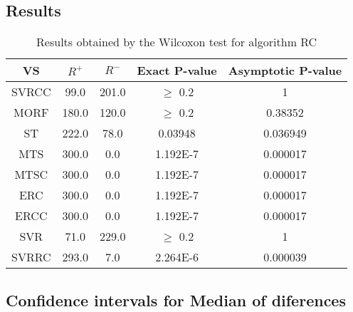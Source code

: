 \documentclass[a4paper,10pt]{article}
\begin{document}
\subsection{Results}

\begin{table}[!htp]
\centering\small
\begin{tabular}{
|c|c|c|c|c|}
\hline
 VS & $R^{+}$ & $R^{-}$ & Exact P-value & Asymptotic P-value \\ \hline 
SVRCC & 99.0 & 201.0 & $\geq$ 0.2 & 1\\ \hline 
MORF & 180.0 & 120.0 & $\geq$ 0.2 & 0.38352\\ \hline 
ST & 222.0 & 78.0 & 0.03948 & 0.036949\\ \hline 
MTS & 300.0 & 0.0 & 1.192E-7 & 0.000017\\ \hline 
MTSC & 300.0 & 0.0 & 1.192E-7 & 0.000017\\ \hline 
ERC & 300.0 & 0.0 & 1.192E-7 & 0.000017\\ \hline 
ERCC & 300.0 & 0.0 & 1.192E-7 & 0.000017\\ \hline 
SVR & 71.0 & 229.0 & $\geq$ 0.2 & 1\\ \hline 
SVRRC & 293.0 & 7.0 & 2.264E-6 & 0.000039\\ \hline 

\end{tabular}
\caption{Results obtained by the Wilcoxon test for algorithm RC}
\end{table}

\subsection{Confidence intervals for Median of diferences}
\end{document}
